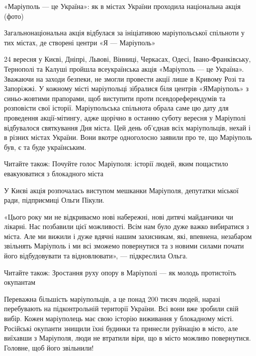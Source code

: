  
 
 
 
 

«Маріуполь — це Україна»: як в містах України проходила національна акція
(фото)

Загальнонаціональна акція відбулася за ініціативою маріупольської спільноти у
тих містах, де створені центри «Я — Маріуполь»

24 вересня у Києві, Дніпрі, Львові, Вінниці, Черкасах, Одесі,
Івано-Франківську, Тернополі та Калуші пройшла всеукраїнська акція «Маріуполь —
це Україна». Зважаючи на заходи безпеки, не змогли провести акції лише в
Кривому Розі та Запоріжжі. У кожному місті маріупольці зібралися біля центрів
«ЯМаріуполь» з синьо-жовтими прапорами, щоб виступити проти псевдореферендумів
та розповісти свої історії. Маріупольська спільнота обрала саме цю дату для
проведення акції-мітингу, адже щорічно в останню суботу вересня у Маріуполі
відбувалося святкування Дня міста. Цей день об'єднав всіх маріупольців, нехай і
в різних містах України. Вони вкотре одноголосно заявили про те, що Маріуполь
був, є та буде українським.

Читайте також: Почуйте голос Маріуполя: історії людей, яким пощастило евакуюватися з блокадного міста

У Києві акція розпочалась виступом мешканки Маріуполя, депутатки міської ради,
підприємиці Ольги Пікули.

«Цього року ми не відкриваємо нові набережні, нові дитячі майданчики чи
лікарні. Нас позбавили цієї можливості. Всім нам було дуже важко вибиратися з
міста. Але ми вижили і дуже вдячні нашим захисникам, які, впевнена, незабаром
звільнять Маріуполь і ми всі зможемо повернутися та з новими силами почати його
відбудовувати та відновлювати», — підкреслила Ольга. 

Читайте також: Зростання руху опору в Маріуполі — як молодь протистоїть окупантам

Переважна більшість маріупольців, а це понад 200 тисяч людей, наразі
перебувають на підконтрольній території України. Всі вони вже зробили свій
вибір. Кожен маріуполець має свою історію виживання у блокадному місті.
Російські окупанти знищили їхні будинки та принесли руйнацію в місто, але
виїхавши з Маріуполя, люди не втратили віри, що в місто можливо повернутися.
Головне, щоб його звільнили! 

